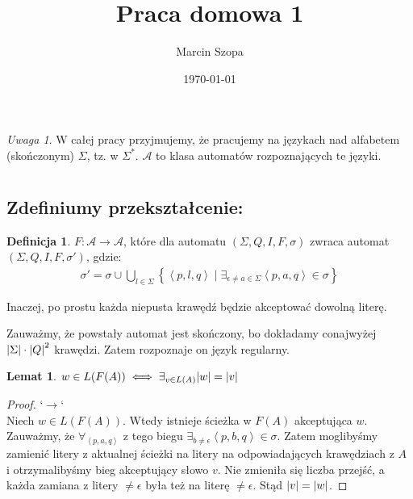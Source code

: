 \documentclass{article}
\title{Praca domowa 1}
\author{Marcin Szopa}
\date{\today}
\newtheorem{lemma}[theorem]{Lemat}
\theoremstyle{definition}
\newtheorem{definition}{Definicja}[section]
\theoremstyle{remark}
\newtheorem*{remark}{Uwaga}
\begin{document}
\maketitle

\begin{remark}
W całej pracy przyjmujemy, że pracujemy na językach nad alfabetem (skończonym) \(\Sigma\), tz. w \( \Sigma^* \). \(\mathcal{A}\) to klasa automatów rozpoznających te języki.
\end{remark}

\section{}

\subsection{Zdefiniumy przekształcenie:}

\begin{definition}
\(F: \mathcal{A} \to \mathcal{A}\), które dla automatu \(\left(\Sigma, Q, I, F, \sigma\right)\) zwraca automat \(\left(\Sigma, Q, I, F, \sigma'\right)\), gdzie:
\begin{align*}
\sigma' = \sigma \cup \bigcup_{l \in \Sigma} \left\{ \left< p, l, q \right> \mid \exists_{\epsilon \neq a \in \Sigma}{\left< p, a, q \right> \in \sigma} \right\}
\end{align*}
\end{definition}
Inaczej, po prostu każda niepusta krawędź będzie akceptować dowolną literę.

Zauważmy, że powstały automat jest skończony, bo dokładamy conajwyżej \(\abs{\Sigma} \cdot \abs{Q}^2\) krawędzi. Zatem rozpoznaje on język regularny.

\begin{lemma}
    \(w \in L(F(A)) \iff \exists_{v \in L(A)} \abs{w}=\abs{v}\)
\end{lemma}
\begin{proof}
`\(\rightarrow\)` \\
Niech \(w \in L(F(A))\). Wtedy istnieje ścieżka w \(F(A)\) akceptująca \(w\).
Zauważmy, że \(\forall_{\left< p, a, q \right>}\) z tego biegu \( \exists_{b \neq \epsilon} \left< p, b, q \right> \in \sigma\).
Zatem moglibyśmy zamienić litery z aktualnej ścieżki na litery na odpowiadających krawędziach z \(A\)
i otrzymalibyśmy bieg akceptujący słowo \(v\). Nie zmieniła się liczba przejść,
a każda zamiana z litery \(\neq \epsilon\) była też na literę \(\neq \epsilon\). Stąd \(\abs{v}=\abs{w}\).
\end{proof}
\end{document}
